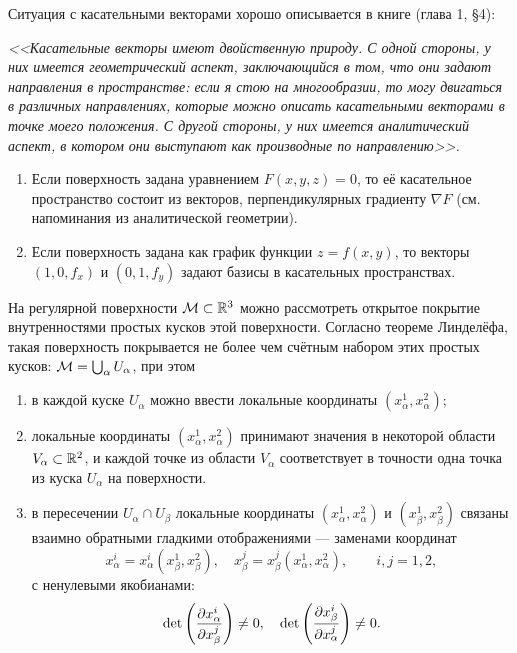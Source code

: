 Ситуация с касательными векторами хорошо описывается в книге \cite{S19} (глава 1, \S 4):

\begin{center}
	\textit{<<Касательные векторы имеют двойственную природу. С одной стороны, у них имеется геометрический аспект, заключающийся в том, что они задают направления в пространстве: если я стою на многообразии, то могу двигаться в различных направлениях, которые можно описать касательными векторами в точке моего положения. С другой стороны, у них имеется аналитический аспект, в котором они выступают как \glqq производные по направлению\grqq>>.}
\end{center}

\begin{example}
	\begin{enumerate}[nolistsep, label=(\arabic*)]
		\item Если поверхность задана уравнением $F(x, y, z) = 0$, то её касательное пространство состоит из векторов, перпендикулярных градиенту $\nabla F$ (см. напоминания из аналитической геометрии).
		\item Если поверхность задана как график функции $z = f(x, y)$, то векторы $(1, 0, f_x)$ и $(0, 1, f_y)$ задают базисы в касательных пространствах.
	\end{enumerate}
\end{example}

На регулярной поверхности $\mathcal{M} \subset \mathbb{R}^3$ можно рассмотреть открытое покрытие внутренностями простых кусков этой поверхности. Согласно теореме Линделёфа\footnotemark, такая поверхность покрывается не более чем счётным набором этих простых кусков: $\mathcal{M} = \bigcup_\alpha U_\alpha$, при этом


\begin{enumerate}[nolistsep, label=(\arabic*)]
	\item в каждой куске $U_\alpha$ можно ввести локальные координаты $(x^1_\alpha, x^2_\alpha)$;
	\item локальные координаты $(x^1_\alpha, x^2_\alpha)$ принимают значения в некоторой области $V_\alpha \subset \mathbb{R}^2$, и каждой точке из области $V_\alpha$ соответствует в точности одна точка из куска $U_\alpha$ на поверхности.
	\item в пересечении $U_\alpha \cap U_\beta$ локальные координаты $(x^1_\alpha, x^2_\alpha)$ и $(x^1_\beta, x^2_\beta)$ связаны взаимно обратными гладкими отображениями --- заменами координат
		\[
			x^i_\alpha = x^i_\alpha(x^1_\beta, x^2_\beta),\quad x^j_\beta = x^j_\beta(x^1_\alpha, x^2_\alpha),\qquad i, j = 1, 2,
		\]
		с ненулевыми якобианами:
		\[
			\det\left(\frac{\partial x^i_\alpha}{\partial x^j_\beta}\right) \ne 0,\quad \det\left(\frac{\partial x^i_\beta}{\partial x^j_\alpha}\right) \ne 0.
		\]
\end{enumerate}

